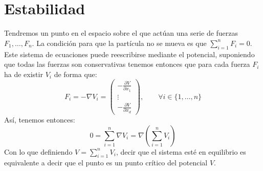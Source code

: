 \chapter{Estabilidad}
\noindent
Tendremos un punto en el espacio sobre el que actúan una serie de fuerzas $F_1,\ldots,F_n$. La condición para que la partícula no se mueva es que $\sum\limits_{i=1}^{n}F_i = 0$. Este sistema de ecuaciones puede reescribirse mediante el potencial, suponiendo que todas las fuerzas son conservativas tenemos entonces que para cada fuerza $F_i$ ha de existir $V_i$ de forma que:
\begin{equation*}
    F_i = -\nabla V_i = \left(\begin{array}{ccc}
        -\frac{\partial V}{\partial x_1} \\
        \vdots \\
        -\frac{\partial V}{\partial x_d} 
    \end{array}\right), \qquad \forall i \in \{1,\ldots,n\}
\end{equation*}
Así, tenemos entonces:
\begin{equation*}
    0 = \sum_{i=1}^{n}\nabla V_i = \nabla\left(\sum_{i=1}^{n}V_i\right)
\end{equation*}
Con lo que definiendo $V = \sum\limits_{i=1}^{n}V_i$, decir que el sistema esté en equilibrio es equivalente a decir que el punto es un punto crítico del potencial $V$.


